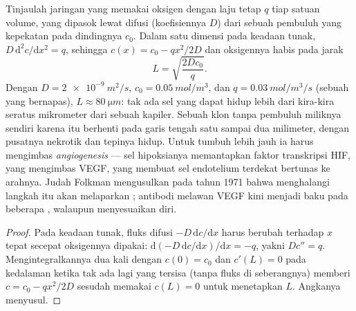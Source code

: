 \begin{proposition}\label{prop:b3:cancer-biology:oxygen}
Tinjaulah jaringan yang memakai oksigen dengan laju tetap $q$ tiap satuan
volume, yang dipasok lewat difusi (koefisiennya $D$) dari sebuah pembuluh yang
kepekatan pada dindingnya $c_{0}$. Dalam satu dimensi pada keadaan tunak, $D\,
\mathrm{d}^{2}c/\mathrm{d}x^{2} = q$, sehingga $c(x) = c_{0} - qx^{2}/2D$ dan
oksigennya habis pada jarak
\[
L = \sqrt{\frac{2Dc_{0}}{q}} .
\]
Dengan $D = \qty{2e-9}{m^2/s}$, $c_{0} = \qty{0.05}{mol/m^3}$, dan $q =
\qty{0.03}{mol/m^3/s}$ (sebuah  yang bernapas), $L \approx \qty{80}{\micro
m}$: tak ada sel yang dapat hidup lebih dari kira-kira seratus mikrometer dari
sebuah kapiler. Sebuah klon tanpa pembuluh miliknya sendiri karena itu berhenti
pada garis tengah satu sampai dua milimeter, dengan pusatnya nekrotik dan
tepinya hidup. Untuk tumbuh lebih jauh ia harus mengimbas \emph{angiogenesis}
--- sel hipoksianya memantapkan faktor transkripsi HIF, yang mengimbas
VEGF, yang membuat sel endotelium terdekat bertunas ke arahnya. Judah
Folkman mengusulkan pada tahun 1971 bahwa menghalangi langkah itu akan
melaparkan ; antibodi melawan VEGF kini menjadi baku pada beberapa
, walaupun  menyesuaikan diri.
\end{proposition}
\begin{proof}
Pada keadaan tunak, fluks difusi $-D\,\mathrm{d}c/\mathrm{d}x$ harus
berubah terhadap $x$ tepat secepat oksigennya dipakai: $\mathrm{d}(-D\,
\mathrm{d}c/\mathrm{d}x)/\mathrm{d}x = -q$, yakni $D c'' = q$.
Mengintegralkannya dua kali dengan $c(0) = c_{0}$ dan $c'(L) = 0$ pada
kedalaman ketika tak ada lagi yang tersisa (tanpa fluks di seberangnya) memberi
$c = c_{0} - qx^{2}/2D$ sesudah memakai $c(L) = 0$ untuk menetapkan $L$.
Angkanya menyusul.
\end{proof}

